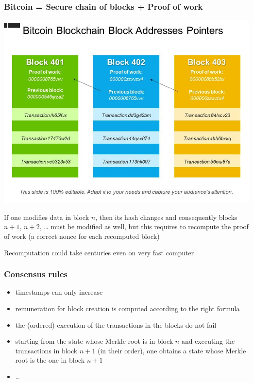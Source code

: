 \documentclass[11pt]{beamer}  %
\begin{document}
\begin{frame}\frametitle{Bitcoin = Secure chain of blocks + Proof of work}

  \begin{center}
    \includegraphics[scale=0.28,clip=false]{pictures/blocks-pow.jpg}
  \end{center}

  \smallskip

  If one modifies data in block $n$, then its hash changes and consequently
  blocks $n+1$, $n+2$, \ldots
  must be modified as well, but this requires to recompute the proof of work
  (a correct nonce for each recomputed block)

  \smallskip

  \begin{redbox}{}
    Recomputation could take centuries even on very fast computer
  \end{redbox}
\end{frame}

\begin{frame}\frametitle{Consensus rules}

  \begin{itemize}
  \item timestamps can only increase
  \item remuneration for block creation is computed according to the right formula
  \item the (ordered) execution of the transactions in the blocks do not fail
  \item starting from the state whose Merkle root is in block $n$ and executing
    the transactions in block $n+1$ (in their order), one obtains a state whose Merkle root is
    the one in block $n+1$
  \item \ldots
  \end{itemize}
\end{frame}
\end{document}
